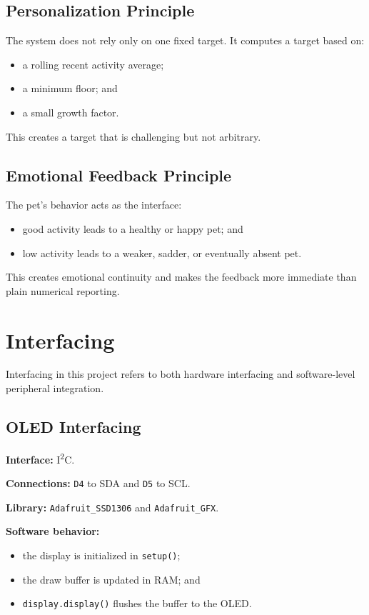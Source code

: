 \documentclass[conference]{IEEEtran}
\begin{document}
\subsection{Personalization Principle}
The system does not rely only on one fixed target. It computes a target based on:
\begin{itemize}
\item a rolling recent activity average;
\item a minimum floor; and
\item a small growth factor.
\end{itemize}
This creates a target that is challenging but not arbitrary.

\subsection{Emotional Feedback Principle}
The pet's behavior acts as the interface:
\begin{itemize}
\item good activity leads to a healthy or happy pet; and
\item low activity leads to a weaker, sadder, or eventually absent pet.
\end{itemize}
This creates emotional continuity and makes the feedback more immediate than plain numerical reporting.

\section{Interfacing}
Interfacing in this project refers to both hardware interfacing and software-level peripheral integration.

\subsection{OLED Interfacing}
\textbf{Interface:} I\textsuperscript{2}C.

\textbf{Connections:} \texttt{D4} to SDA and \texttt{D5} to SCL.

\textbf{Library:} \texttt{Adafruit\_SSD1306} and \texttt{Adafruit\_GFX}.

\textbf{Software behavior:}
\begin{itemize}
\item the display is initialized in \texttt{setup()};
\item the draw buffer is updated in RAM; and
\item \texttt{display.display()} flushes the buffer to the OLED.
\end{itemize}
\end{document}
